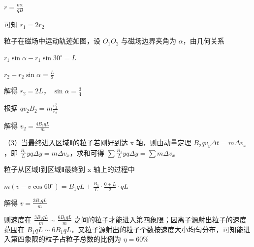 \documentclass[\gkver]{gaokaozhenti}
\begin{document}
\begin{enumerate}
{ $r=\frac{mv}{qB}$

可知  $r_{1}=2r_{2}$

粒子在磁场中运动轨迹如图，设  $O_{1}O_{2}$ 与磁场边界夹角为  $\alpha$，由几何关系

 $r_{1}\sin\alpha-r_{1}\sin30^{\circ}=L$

 $r_{2}-r_{2}\sin\alpha=\frac{L}{2}$

解得  $r_{2}=2L$， $\sin\alpha=\frac{3}{4}$

根据  $qv_{2}B_{2}=m\frac{v_{2}^{2}}{r_{2}}$

解得  $v_{2}=\frac{4B_{1}qL}{m}$

（3）当最终进入区域Ⅱ的粒子若刚好到达 x 轴，则由动量定理  $B_{2}qv_{y}\Delta t = m\Delta v_{x}$，即  $\frac{B_{1}}{L}yq\Delta y = m\Delta v_{x}$，求和可得  $\sum\frac{B_{1}}{L}yq\Delta y = \sum m\Delta v_{x}$

粒子从区域Ⅰ到区域Ⅱ最终到 x 轴上的过程中

 $m(v-v\cos60^{\circ})=B_{1}qL+\frac{B_{1}}{L}\cdot\frac{0+L}{2}\cdot qL$

解得  $v=\frac{3B_{1}qL}{m}$

则速度在  $\frac{3B_{1}qL}{m} \sim \frac{6B_{1}qL}{m}$ 之间的粒子才能进入第四象限；因离子源射出粒子的速度范围在  $B_{1}qL \sim 6B_{1}qL$，又粒子源射出的粒子个数按速度大小均匀分布，可知能进入第四象限的粒子占粒子总数的比例为  $\eta = 60\%$
}

\end{enumerate}
\end{document}
